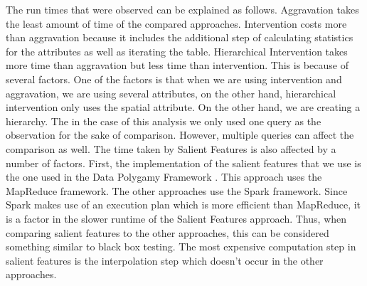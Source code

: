 The run times that were observed can be explained as follows. Aggravation takes the least amount of time of the compared approaches. Intervention costs more than aggravation because it includes the additional step of calculating statistics for the attributes as well as iterating the table. Hierarchical Intervention takes more time than aggravation but less time than intervention. This is because of several factors. One of the factors is that when we are using intervention and aggravation, we are using several attributes, on the other hand, hierarchical intervention only uses the spatial attribute. On the other hand, we are creating a hierarchy. The in the case of this analysis we only used one query as the observation for the sake of comparison. However, multiple queries can affect the comparison as well. The time taken by Salient Features is also affected by a number of factors. First, the implementation of the salient features that we use is the one used in the Data Polygamy Framework \citep{chirigati2016data}. This approach uses the MapReduce framework. The other approaches use the Spark framework. Since Spark makes use of an execution plan which is more efficient than MapReduce, it is a factor in the slower runtime of the Salient Features approach. Thus, when comparing salient features to the other approaches, this can be considered something similar to black box testing. The most expensive computation step in salient features is the interpolation step which doesn't occur in the other approaches.


